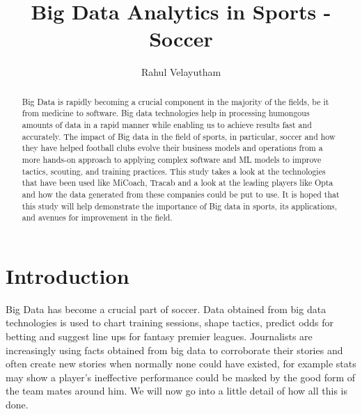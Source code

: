 \documentclass[sigconf]{acmart}
\begin{document}
\title{Big Data Analytics in Sports - Soccer}


\author{Rahul Velayutham}

\renewcommand{\shortauthors}{}


\begin{abstract}
Big Data is rapidly becoming a crucial component in the majority of the fields, be it from medicine to software. Big data technologies help in processing humongous amounts of data in a rapid manner while enabling us to achieve results fast and accurately. The impact of Big data in the field of sports, in particular, soccer and how they have helped football clubs evolve their business models and operations from a more hands-on approach to applying complex software and ML models to improve tactics, scouting, and training practices. This study takes a look at the technologies that have been used like MiCoach, Tracab and a look at the leading players like Opta and how the data generated from these companies could be put to use. It is hoped that this study will help demonstrate the importance of Big data in sports, its applications, and avenues for improvement in the field.
\end{abstract}


\maketitle

\section{Introduction}

Big Data has become a crucial part of soccer. Data obtained from big data technologies is used to chart training sessions, shape tactics, predict odds for betting and suggest line ups for fantasy premier leagues. Journalists are increasingly using facts obtained from big data to corroborate their stories and often create new stories when normally none could have existed, for example stats may show a player’s ineffective performance could be masked by the good form of the team mates around him. We will now go into a little detail of how all this is done.
\end{document}
